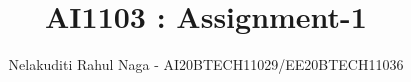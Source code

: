 \documentclass[journal,12pt,twocolumn]{IEEEtran}
\DeclareMathOperator*{\Res}{Res}
\begin{document}
\newcommand{\BEQA}{\begin{eqnarray}}
\newcommand{\EEQA}{\end{eqnarray}}
\newcommand{\define}{\stackrel{\triangle}{=}}

\raggedbottom
\setlength{\parindent}{0pt}
\providecommand{\mbf}{\mathbf}
\providecommand{\pr}[1]{\ensuremath{\Pr\left(#1\right)}}
\providecommand{\qfunc}[1]{\ensuremath{Q\left(#1\right)}}
\providecommand{\sbrak}[1]{\ensuremath{{}\left[#1\right]}}
\providecommand{\lsbrak}[1]{\ensuremath{{}\left[#1\right.}}
\providecommand{\rsbrak}[1]{\ensuremath{{}\left.#1\right]}}
\providecommand{\brak}[1]{\ensuremath{\left(#1\right)}}
\providecommand{\lbrak}[1]{\ensuremath{\left(#1\right.}}
\providecommand{\rbrak}[1]{\ensuremath{\left.#1\right)}}
\providecommand{\cbrak}[1]{\ensuremath{\left\{#1\right\}}}
\providecommand{\lcbrak}[1]{\ensuremath{\left\{#1\right.}}
\providecommand{\rcbrak}[1]{\ensuremath{\left.#1\right\}}}
\theoremstyle{remark}
\newtheorem{rem}{Remark}
\newcommand{\sgn}{\mathop{\mathrm{sgn}}}
\providecommand{\abs}[1]{\vert#1\vert}
\providecommand{\res}[1]{\Res\displaylimits_{#1}} 
\providecommand{\norm}[1]{\lVert#1\rVert}
\providecommand{\mtx}[1]{\mathbf{#1}}
\providecommand{\mean}[1]{E[ #1 ]}
\providecommand{\fourier}{\overset{\mathcal{F}}{ \rightleftharpoons}}
\providecommand{\system}{\overset{\mathcal{H}}{ \longleftrightarrow}}
\newcommand{\solution}{\noindent \textbf{Solution: }}
\newcommand{\cosec}{\,\text{cosec}\,}
\providecommand{\dec}[2]{\ensuremath{\overset{#1}{\underset{#2}{\gtrless}}}}
\newcommand{\myvec}[1]{\ensuremath{\begin{pmatrix}#1\end{pmatrix}}}
\newcommand{\mydet}[1]{\ensuremath{\begin{vmatrix}#1\end{vmatrix}}}
\makeatletter
{}
\makeatother
\let\StandardTheFigure\thefigure
\let\vec\mathbf
\renewcommand{\thefigure}{\theproblem}
\def\putbox#1#2#3{\makebox[0in][l]{\makebox[#1][l]{}\raisebox{\baselineskip}[0in][0in]{\raisebox{#2}[0in][0in]{#3}}}}
     \def\rightbox#1{\makebox[0in][r]{#1}}
     \def\centbox#1{\makebox[0in]{#1}}
     \def\topbox#1{\raisebox{-\baselineskip}[0in][0in]{#1}}
     \def\midbox#1{\raisebox{-0.5\baselineskip}[0in][0in]{#1}}
\vspace{3cm}
\title{ AI1103 : Assignment-1}
\author{Nelakuditi Rahul Naga - AI20BTECH11029/EE20BTECH11036}
\maketitle
\newpage
\bigskip
\renewcommand{\thefigure}{\theenumi}
\renewcommand{\thetable}{\theenumi}
\end{document}
